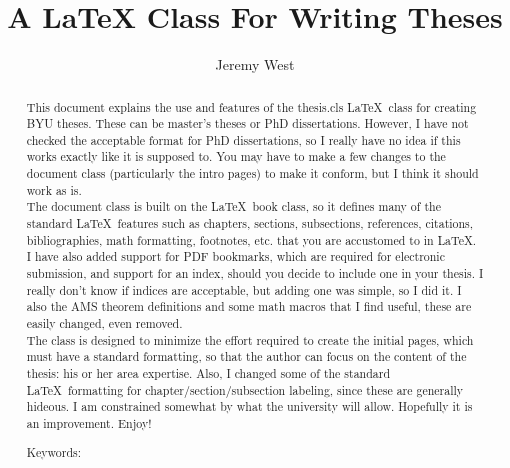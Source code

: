 \documentclass[12pt]{thesis}
\author{Jeremy West} %
\title{A LaTeX Class For Writing Theses}
\begin{document}
\frontmatter
\maketitle  %

\begin{abstract} %


This document explains the use and features of the thesis.cls \LaTeX\ class for creating BYU theses. These can be master's theses or PhD dissertations. However, I have not checked the acceptable format for PhD dissertations, so I really have no idea if this works exactly like it is supposed to. You may have to make a few changes to the document class (particularly the intro pages) to make it conform, but I think it should work as is.\\ %
	
The document class is built on the \LaTeX\ book class, so it defines many of the standard \LaTeX\ features such as chapters, sections, subsections, references, citations, bibliographies, math formatting, footnotes, etc. that you are accustomed to in \LaTeX. I have also added support for PDF bookmarks, which are required for electronic submission, and support for an index, should you decide to include one in your thesis. I really don't know if indices are acceptable, but adding one was simple, so I did it. I also the AMS theorem definitions and some math macros that I find useful, these are easily changed, even removed.\\
	
The class is designed to minimize the effort required to create the initial pages, which must have a standard formatting, so that the author can focus on the content of the thesis: his or her area expertise. Also, I changed some of the standard \LaTeX\ formatting for chapter/section/subsection labeling, since these are generally hideous. I am constrained somewhat by what the university will allow. Hopefully it is an improvement. Enjoy!
  \vskip 3.25in
 
\noindent Keywords: %
\end{abstract}
\end{document}
